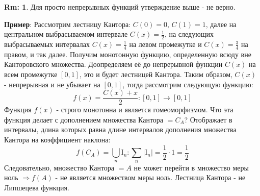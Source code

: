 \documentclass[12pt]{article}
\newcommand{\MI}{\mathrm{I}}
\theoremstyle{definition}
\newtheorem{rem}{Rm:}
\begin{document}
\begin{rem}
	Для просто непрерывных функций утверждение выше - не верно. 
\end{rem}
\textbf{Пример}: Рассмотрим лестницу Кантора: $C(0) = 0, \, C(1) = 1$, далее на центральном выбрасываемом интервале $C(x) = \tfrac{1}{2}$, на следующих выбрасываемых интервалах $C(x) = \tfrac{1}{4}$ на левом промежутке и $C(x) = \tfrac{3}{4}$ на правом, и так далее. Получим монотонную функцию, определенную всюду вне Канторовского множества. Доопределяем её до непрерывной функции $C(x)$ на всем промежутке $[0,1]$, это и будет лестницей Кантора. Таким образом, $C(x)$ - непрерывная и не убывает на $[0,1]$, тогда рассмотрим следующую функцию:
$$
	f(x) = \dfrac{C(x) + x}{2} \colon [0,1] \to [0,1]
$$
Функция $f(x)$ - строго монотонна и является гомеоморфизмом. Что эта функция делает с дополнением множества Кантора $=C_A$? Отображает в интервалы, длина которых равна длине интервалов дополнения множества Кантора на коэффициент наклона:
$$
	f(C_A) = \bigcup\limits_n \MI_n \colon \sum\limits_{n} |\MI_n| = \dfrac{1}{2}{\cdot}1 = \dfrac{1}{2}
$$
Следовательно, множество Кантора $= A$ не может перейти в множество меры ноль $\Rightarrow f(A)$ - не является множеством меры ноль. Лестница Кантора - не Липшецева функция.
\end{document}
